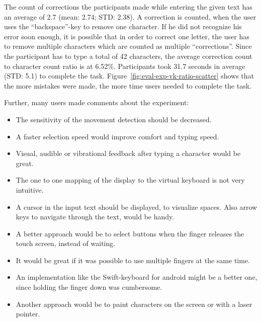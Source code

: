 The count of corrections the participants made while entering the given text has an average of 2.7 (mean: 2.74; \ac{STD}: 2.38). A correction is counted, when the user uses the \enquote{backspace}-key to remove one character. If he did not recognize his error soon enough, it is possible that in order to correct one letter, the user has to remove multiple characters which are counted as multiple \enquote{corrections}. Since the participant has to type a total of 42 characters, the average correction count to character count ratio is at 6.52\%.
Participants took 31.7 seconds in average (\ac{STD}: 5.1) to complete the task. Figure~\ref{fig:eval-exp-vk-ratio-scatter} shows that the more mistakes were made, the more time users needed to complete the task.

Further, many users made comments about the experiment:
\begin{itemize}
  \item The sensitivity of the movement detection should be decreased.
  \item A faster selection speed would improve comfort and typing speed.
  \item Visual, audible or vibrational feedback after typing a character would be great.
  \item The one to one mapping of the display to the virtual keyboard is not very intuitive.
  \item A cursor in the input text should be displayed, to visualize spaces. Also arrow keys to navigate through the text, would be handy.
  \item A better approach would be to select buttons when the finger releases the touch screen, instead of waiting.
  \item It would be great if it was possible to use multiple fingers at the same time.
  \item An implementation like the Swift-keyboard for android might be a better one, since holding the finger down was cumbersome.
  \item Another approach would be to paint characters on the screen or with a laser pointer.
\end{itemize}


